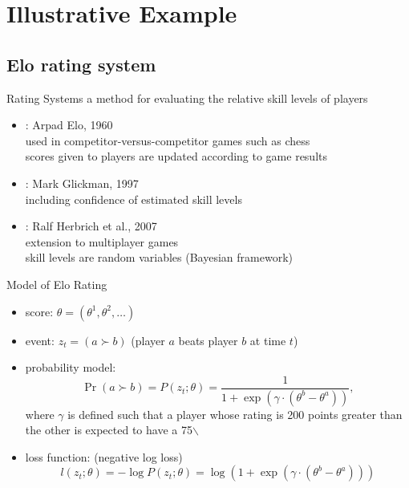 \documentclass[fleqn,aspectratio=1610]{beamer}
\begin{document}
\section{Illustrative Example}
\label{sec:orgab9a713}

\subsection{Elo rating system}
\label{sec:org567b732}
\begin{frame}[label={sec:org7604891}]{Rating Systems}
a method for evaluating the relative skill levels of players
\begin{itemize}
\item {}: Arpad Elo, 1960\\[0pt]
used in competitor-versus-competitor games such as chess\\[0pt]
scores given to players are updated according to game results
\item {}: Mark Glickman, 1997\\[0pt]
including confidence of estimated skill levels
\item {}: Ralf Herbrich et al., 2007\\[0pt]
extension to multiplayer games\\[0pt]
skill levels are random variables (Bayesian framework)
\end{itemize}
\end{frame}

\begin{frame}[label={sec:orga64f345}]{Model of Elo Rating}
\begin{itemize}
\item score: \(\theta=(\theta^{1},\theta^{2},\dotsc)\)
\item event: \(z_{t}=(a\succ b)\) (player \(a\) beats player \(b\) at time \(t\))
\item probability model: 
\begin{equation}
  \Pr(a\succ b)
  =P(z_{t};\theta)
  =\frac{1}{1+\exp(\gamma\cdot(\theta^{b}-\theta^{a}))},
\end{equation}
where \(\gamma\) is defined such that
a player whose rating is 200 points greater than the other
is expected to have a 75$\backslash$%
\item loss function: (negative log loss)
\begin{equation}
  l(z_{t};\theta)
  =-\log P(z_{t};\theta)
  =\log(1+\exp(\gamma\cdot(\theta^{b}-\theta^{a})))
\end{equation}
\end{itemize}
\end{frame}
\end{document}
